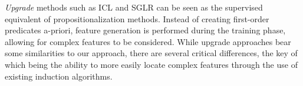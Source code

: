\documentclass{article}
\theoremstyle{definition}
\begin{document}
\emph{Upgrade} methods such as ICL \citep{van2001upgrade} and SGLR \citep{popescul200716} can be seen as the supervised equivalent of propositionalization methods. Instead of creating first-order predicates a-priori, feature generation is performed during the training phase, allowing for complex features to be considered. %
While upgrade approaches bear some similarities to our approach, there are several critical differences, the key of which being the ability to more easily locate complex features through the use of existing induction algorithms. 


\end{document}
